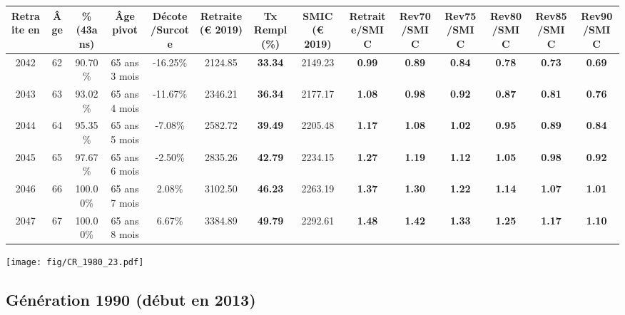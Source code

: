 \begin{adjustbox}{max width=\textwidth} 
\begin{tabular}[htb]{|c|c||c|c|c||c|c||c||c|c|c|c|c|c|} 
\hline 
 Retraite en &  Âge &  \%(43ans) &  Âge pivot &  Décote/Surcote &  Retraite (\euro{} 2019) &  Tx Rempl(\%) &  SMIC (\euro{} 2019) &  Retraite/SMIC &  Rev70/SMIC &  Rev75/SMIC &  Rev80/SMIC &  Rev85/SMIC &  Rev90/SMIC \\ 
\hline \hline 
 2042 &  62 &  90.70\% &  65 ans 3 mois &  -16.25\% &  2124.85 &  {\bf 33.34} &  2149.23 &  {\bf {\color{red} 0.99}} &  {\bf {\color{red} 0.89}} &  {\bf {\color{red} 0.84}} &  {\bf {\color{red} 0.78}} &  {\bf {\color{red} 0.73}} &  {\bf {\color{red} 0.69}} \\ 
\hline 
 2043 &  63 &  93.02\% &  65 ans 4 mois &  -11.67\% &  2346.21 &  {\bf 36.34} &  2177.17 &  {\bf 1.08} &  {\bf {\color{red} 0.98}} &  {\bf {\color{red} 0.92}} &  {\bf {\color{red} 0.87}} &  {\bf {\color{red} 0.81}} &  {\bf {\color{red} 0.76}} \\ 
\hline 
 2044 &  64 &  95.35\% &  65 ans 5 mois &  -7.08\% &  2582.72 &  {\bf 39.49} &  2205.48 &  {\bf 1.17} &  {\bf 1.08} &  {\bf 1.02} &  {\bf {\color{red} 0.95}} &  {\bf {\color{red} 0.89}} &  {\bf {\color{red} 0.84}} \\ 
\hline 
 2045 &  65 &  97.67\% &  65 ans 6 mois &  -2.50\% &  2835.26 &  {\bf 42.79} &  2234.15 &  {\bf 1.27} &  {\bf 1.19} &  {\bf 1.12} &  {\bf 1.05} &  {\bf {\color{red} 0.98}} &  {\bf {\color{red} 0.92}} \\ 
\hline 
 2046 &  66 &  100.00\% &  65 ans 7 mois &  2.08\% &  3102.50 &  {\bf 46.23} &  2263.19 &  {\bf 1.37} &  {\bf 1.30} &  {\bf 1.22} &  {\bf 1.14} &  {\bf 1.07} &  {\bf 1.01} \\ 
\hline 
 2047 &  67 &  100.00\% &  65 ans 8 mois &  6.67\% &  3384.89 &  {\bf 49.79} &  2292.61 &  {\bf 1.48} &  {\bf 1.42} &  {\bf 1.33} &  {\bf 1.25} &  {\bf 1.17} &  {\bf 1.10} \\ 
\hline 
\hline 
\end{tabular} 
\end{adjustbox} 
 
 \vspace{0.1cm} 

 \begin{center}\texttt{[image: fig/CR\_1980\_23.pdf]}\end{center} \label{fig/CR_1980_23.pdf} 

\newpage 
 
\subsection{Génération 1990 (début en 2013)} 

